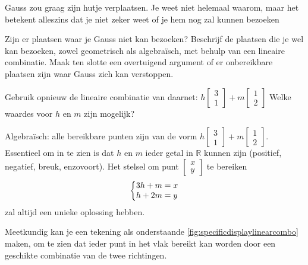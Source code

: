 \documentclass{ximera}
\begin{document}
\begin{exercise}
Gauss zou graag zijn hutje verplaatsen.
Je weet niet helemaal waarom, maar het betekent alleszins dat je niet zeker weet of je hem nog zal kunnen bezoeken\dot{}\newline

Zijn er plaatsen waar je Gauss niet kan bezoeken?
Beschrijf de plaatsen die je wel kan bezoeken, zowel geometrisch als algebraïsch, met behulp van een lineaire combinatie.
Maak ten slotte een overtuigend argument of er onbereikbare plaatsen zijn waar Gauss zich kan verstoppen.
\begin{hint}
    Gebruik opnieuw de lineaire combinatie van daarnet: \(h \begin{bmatrix} 3 \\ 1 \end{bmatrix} + m \begin{bmatrix} 1 \\ 2 \end{bmatrix}\)
    Welke waardes voor \(h\) en \(m\) zijn mogelijk?
\end{hint}
\begin{oplossing}
    Algebraïsch: alle bereikbare punten zijn van de vorm \(h \begin{bmatrix} 3 \\ 1 \end{bmatrix} + m \begin{bmatrix} 1 \\ 2 \end{bmatrix}\).
    Essentieel om in te zien is dat \(h\) en \(m\) ieder getal in \(\mathbb{R}\) kunnen zijn (positief, negatief, breuk, enzovoort).
    Het stelsel om punt \(\begin{bmatrix} x \\ y \end{bmatrix}\) te bereiken
    \[
    \left\{
        \begin{array}{@{}l@{}}
        3h+m=x\\
        h+2m=y
        \end{array}
    \right.
    \]
    zal altijd een unieke oplossing hebben.\newline

    Meetkundig kan je een tekening als onderstaande \cref{fig:specificdisplaylinearcombo} maken, om te zien dat ieder punt in het vlak bereikt kan worden door een geschikte combinatie van de twee richtingen.
    \begin{figure}[h!]
    \begin{tikzpicture}


\end{tikzpicture}
\end{figure}
\end{oplossing}
\end{exercise}
\end{document}
